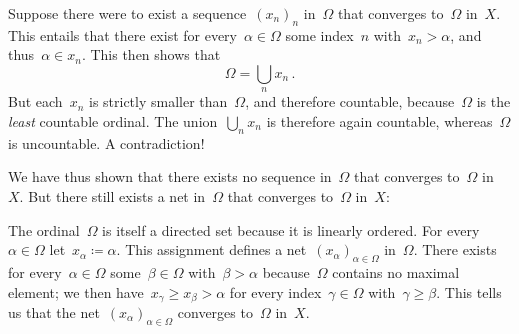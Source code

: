 Suppose there were to exist a sequence~$(x_n)_n$ in~$Ω$ that converges to~$Ω$ in~$X$.
This entails that there exist for every~$α ∈ Ω$ some index~$n$ with~$x_n > α$, and thus~$α ∈ x_n$.
This then shows that
\[
	Ω = ⋃_n x_n \,.
\]
But each~$x_n$ is strictly smaller than~$Ω$, and therefore countable, because~$Ω$ is the \emph{least} countable ordinal.
The union~$⋃_n x_n$ is therefore again countable, whereas~$Ω$ is uncountable.
A contradiction!

We have thus shown that there exists no sequence in~$Ω$ that converges to~$Ω$ in~$X$.
But there still exists a net in~$Ω$ that converges to~$Ω$ in~$X$:

The ordinal~$Ω$ is itself a directed set because it is linearly ordered.
For every~$α ∈ Ω$ let~$x_α ≔ α$.
This assignment defines a net~$( x_α )_{α ∈ Ω}$ in~$Ω$.
There exists for every~$α ∈ Ω$ some~$β ∈ Ω$ with~$β > α$ because~$Ω$ contains no maximal element;
we then have~$x_γ ≥ x_β > α$ for every index~$γ ∈ Ω$ with~$γ ≥ β$.
This tells us that the net~$( x_α )_{α ∈ Ω}$ converges to~$Ω$ in~$X$.
